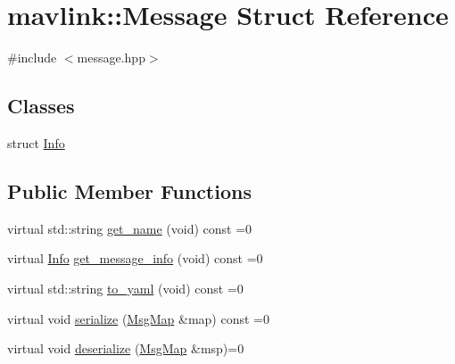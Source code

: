 \hypertarget{structmavlink_1_1Message}{}\section{mavlink\+:\+:Message Struct Reference}
\label{structmavlink_1_1Message}


{\ttfamily \#include $<$message.\+hpp$>$}

\subsection*{Classes}
\begin{DoxyCompactItemize}
\item 
struct \hyperlink{structmavlink_1_1Message_1_1Info}{Info}
\end{DoxyCompactItemize}
\subsection*{Public Member Functions}
\begin{DoxyCompactItemize}
\item 
virtual std\+::string \hyperlink{structmavlink_1_1Message_acfcd821ce25f7e4e2633f44d4a57b185}{get\+\_\+name} (void) const =0
\item 
virtual \hyperlink{structmavlink_1_1Message_1_1Info}{Info} \hyperlink{structmavlink_1_1Message_abf1ca05ae7564100d52b04473a784d1c}{get\+\_\+message\+\_\+info} (void) const =0
\item 
virtual std\+::string \hyperlink{structmavlink_1_1Message_a6a2a01c5fdb6e6039a89f43923085e81}{to\+\_\+yaml} (void) const =0
\item 
virtual void \hyperlink{structmavlink_1_1Message_a8aebc1882e5e4b7838909b5fdd56ef1d}{serialize} (\hyperlink{classmavlink_1_1MsgMap}{Msg\+Map} \&map) const =0
\item 
virtual void \hyperlink{structmavlink_1_1Message_a082824377e57f4e90bce4cba1a44f90b}{deserialize} (\hyperlink{classmavlink_1_1MsgMap}{Msg\+Map} \&msp)=0
\end{DoxyCompactItemize}
